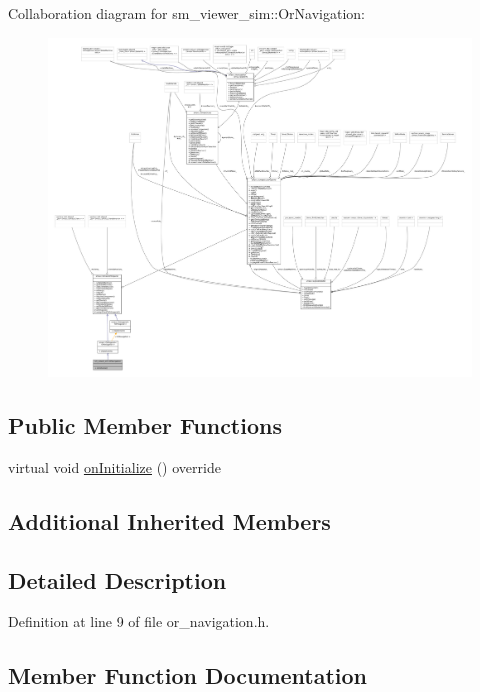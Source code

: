 Collaboration diagram for sm\+\_\+viewer\+\_\+sim\+:\+:Or\+Navigation\+:
\nopagebreak
\begin{figure}[H]
\begin{center}
\leavevmode
\includegraphics[width=350pt]{classsm__viewer__sim_1_1OrNavigation__coll__graph}
\end{center}
\end{figure}
\subsection*{Public Member Functions}
\begin{DoxyCompactItemize}
\item 
virtual void \hyperlink{classsm__viewer__sim_1_1OrNavigation_a6f39ecbb3c1ad253c283588df860a8c4}{on\+Initialize} () override
\end{DoxyCompactItemize}
\subsection*{Additional Inherited Members}


\subsection{Detailed Description}


Definition at line 9 of file or\+\_\+navigation.\+h.



\subsection{Member Function Documentation}
\mbox{\label{classsm__viewer__sim_1_1OrNavigation_a6f39ecbb3c1ad253c283588df860a8c4}} 
